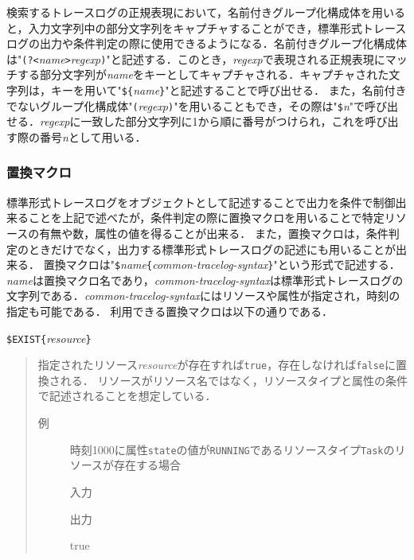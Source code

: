 検索するトレースログの正規表現において，名前付きグループ化構成体を用いると，入力文字列中の部分文字列をキャプチャすることができ，標準形式トレースログの出力や条件判定の際に使用できるようになる．名前付きグループ化構成体は"\texttt{(?<}\textit{name}\texttt{>}\textit{regexp}\texttt{)}"と記述する．このとき，\textit{regexp}で表現される正規表現にマッチする部分文字列が\textit{name}をキーとしてキャプチャされる．キャプチャされた文字列は，キーを用いて"\verb|${|\textit{name}\verb|}|"と記述することで呼び出せる．
また，名前付きでないグループ化構成体"\texttt{(}\textit{regexp}\texttt{)}"を用いることもでき，その際は"\texttt{\$}\textit{n}"で呼び出せる．\textit{regexp}に一致した部分文字列に1から順に番号がつけられ，これを呼び出す際の番号\textit{n}として用いる．

\subsubsection{置換マクロ}

標準形式トレースログをオブジェクトとして記述することで出力を条件で制御出来ることを上記で述べたが，条件判定の際に置換マクロを用いることで特定リソースの有無や数，属性の値を得ることが出来る．
また，置換マクロは，条件判定のときだけでなく，出力する標準形式トレースログの記述にも用いることが出来る．
置換マクロは"\verb|$|{\it name}\verb|{|{\it common-tracelog-syntax}\verb|}|"という形式で記述する．{\it name}は置換マクロ名であり，{\it common-tracelog-syntax}は標準形式トレースログの文字列である．{\it common-tracelog-syntax}にはリソースや属性が指定され，時刻の指定も可能である．
利用できる置換マクロは以下の通りである．

\vspace{1zw}
\noindent
\verb|$EXIST{|\textit{resource}\verb|}|
\vspace{-1zw}
\begin{quote}
指定されたリソース{\it resource}が存在すれば{\tt true}，存在しなければ{\tt false}に置換される．
リソースがリソース名ではなく，リソースタイプと属性の条件で記述されることを想定している．

\begin{description}
\item[例] 時刻1000に属性{\tt state}の値が{\tt RUNNING}であるリソースタイプ{\tt Task}のリソースが存在する場合

\hspace*{-1zw}入力\vspace{-1.75zw}
\hspace*{-1zw}出力\vspace{-1.75zw}
\begin{EBNF}
true
\end{EBNF}
\end{description}

\end{quote}

